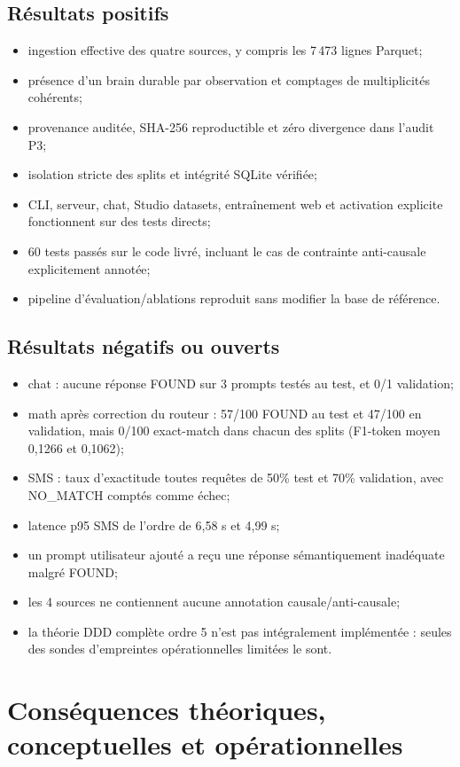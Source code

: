 \documentclass[11pt,a4paper,openany]{book}
\begin{document}
\section{Résultats positifs}
\begin{itemize}
\item ingestion effective des quatre sources, y compris les 7\,473 lignes Parquet;
\item présence d'un brain durable par observation et comptages de multiplicités cohérents;
\item provenance auditée, SHA-256 reproductible et zéro divergence dans l'audit P3;
\item isolation stricte des splits et intégrité SQLite vérifiée;
\item CLI, serveur, chat, Studio datasets, entraînement web et activation explicite fonctionnent sur des tests directs;
\item 60 tests passés sur le code livré, incluant le cas de contrainte anti-causale explicitement annotée;
\item pipeline d'évaluation/ablations reproduit sans modifier la base de référence.
\end{itemize}
\section{Résultats négatifs ou ouverts}
\begin{itemize}
\item chat : aucune réponse FOUND sur 3 prompts testés au test, et 0/1 validation;
\item math après correction du routeur : 57/100 FOUND au test et 47/100 en validation, mais 0/100 exact-match dans chacun des splits (F1-token moyen 0,1266 et 0,1062);
\item SMS : taux d'exactitude toutes requêtes de 50\% test et 70\% validation, avec NO\_MATCH comptés comme échec;
\item latence p95 SMS de l'ordre de 6,58 s et 4,99 s;
\item un prompt utilisateur ajouté a reçu une réponse sémantiquement inadéquate malgré FOUND;
\item les 4 sources ne contiennent aucune annotation causale/anti-causale;
\item la théorie DDD complète ordre 5 n'est pas intégralement implémentée : seules des sondes d'empreintes opérationnelles limitées le sont.
\end{itemize}

\chapter{Conséquences théoriques, conceptuelles et opérationnelles}
\end{document}
